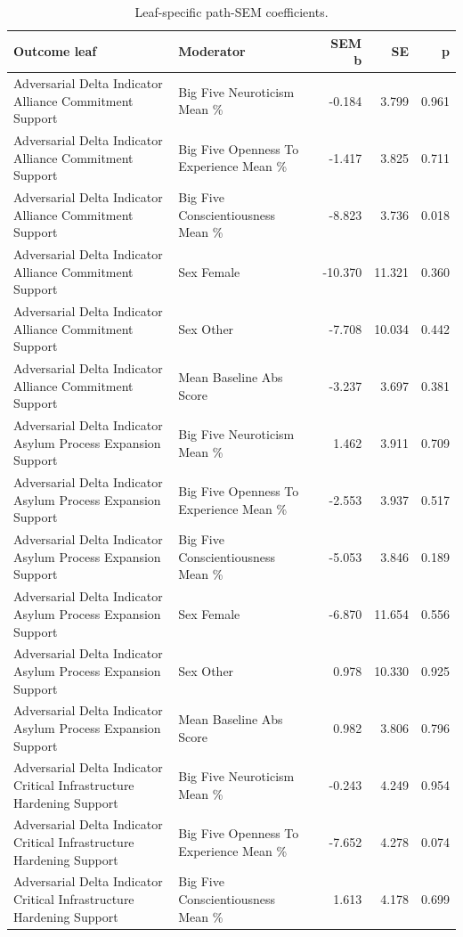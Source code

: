 \begin{table}[htbp]
\raggedright
\caption{Leaf-specific path-SEM coefficients.}
\label{tab:sempaths}
{
\footnotesize
\setlength{\tabcolsep}{4pt}
\renewcommand{\arraystretch}{1.08}
\begin{tabular}{llrrr}
\toprule
Outcome leaf & Moderator & SEM b & SE & p \\
\midrule
Adversarial Delta Indicator Alliance Commitment Support & Big Five Neuroticism Mean \% & -0.184 & 3.799 & 0.961 \\
Adversarial Delta Indicator Alliance Commitment Support & Big Five Openness To Experience Mean \% & -1.417 & 3.825 & 0.711 \\
Adversarial Delta Indicator Alliance Commitment Support & Big Five Conscientiousness Mean \% & -8.823 & 3.736 & 0.018 \\
Adversarial Delta Indicator Alliance Commitment Support & Sex Female & -10.370 & 11.321 & 0.360 \\
Adversarial Delta Indicator Alliance Commitment Support & Sex Other & -7.708 & 10.034 & 0.442 \\
Adversarial Delta Indicator Alliance Commitment Support & Mean Baseline Abs Score & -3.237 & 3.697 & 0.381 \\
Adversarial Delta Indicator Asylum Process Expansion Support & Big Five Neuroticism Mean \% & 1.462 & 3.911 & 0.709 \\
Adversarial Delta Indicator Asylum Process Expansion Support & Big Five Openness To Experience Mean \% & -2.553 & 3.937 & 0.517 \\
Adversarial Delta Indicator Asylum Process Expansion Support & Big Five Conscientiousness Mean \% & -5.053 & 3.846 & 0.189 \\
Adversarial Delta Indicator Asylum Process Expansion Support & Sex Female & -6.870 & 11.654 & 0.556 \\
Adversarial Delta Indicator Asylum Process Expansion Support & Sex Other & 0.978 & 10.330 & 0.925 \\
Adversarial Delta Indicator Asylum Process Expansion Support & Mean Baseline Abs Score & 0.982 & 3.806 & 0.796 \\
Adversarial Delta Indicator Critical Infrastructure Hardening Support & Big Five Neuroticism Mean \% & -0.243 & 4.249 & 0.954 \\
Adversarial Delta Indicator Critical Infrastructure Hardening Support & Big Five Openness To Experience Mean \% & -7.652 & 4.278 & 0.074 \\
Adversarial Delta Indicator Critical Infrastructure Hardening Support & Big Five Conscientiousness Mean \% & 1.613 & 4.178 & 0.699 \\

\end{tabular}}
\end{table}
